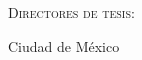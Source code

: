 \begin{titlepage}
\begin{adjustbox}{max width=1.2\linewidth, right}
\begin{minipage}[c][0.99\textheight][t]{0.95\textwidth}
            \vspace{60pt}
            {\fontsize{14}{14}\selectfont\textsc{Directores de tesis:\\}}
            \vspace{10pt}
            {\fontsize{14}{14}\selectfont\textbf{\thesisdirectors}}

            \vfill
            {\fontsize{12}{12}\selectfont Ciudad de México\\}
            {\fontsize{12}{12}\selectfont \thesisdate\\}
            \vspace{40pt}
        \end{minipage}
    \end{adjustbox}
\end{titlepage}